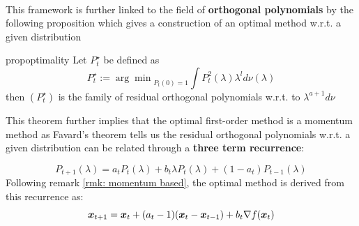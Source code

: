 \documentclass{article}
\begin{document}
\paragraph{}
This framework is further linked to the field of \textbf{orthogonal polynomials} by the following proposition which gives a construction of an optimal method w.r.t. a given distribution 
\begin{restatable}{prop}{optimality}\cite{pedregosa2020acceleration}
 \label{prop: optimality}
 Let $P_t^\star$ be defined as
 \begin{equation}
     P_t^\star:={\arg \min}_{P_t(0)=1} \int P_t^2(\lambda) \lambda^l d\nu(\lambda)
 \end{equation}
 then $(P_t^\star)$ is the family of residual orthogonal polynomials w.r.t. to $\lambda^{a+1}d\nu$
\end{restatable}

This theorem further implies that the  optimal first-order method is a momentum method as Favard's theorem \cite{marcellan2001favard} tells us the residual orthogonal polynomials w.r.t. a given distribution can be related through a \textbf{three term recurrence}:

\begin{equation}
    P_{t+1}(\lambda)=a_tP_t(\lambda)+b_t\lambda P_t(\lambda)+(1-a_t)P_{t-1}(\lambda)
\end{equation}
Following remark \ref{rmk: momentum based}, the optimal method is derived from this recurrence as:
\begin{equation}
    {\boldsymbol x}_{t+1}={\boldsymbol x}_t+(a_t-1)({\boldsymbol x}_t-{\boldsymbol x}_{t-1})+b_t\nabla f({\boldsymbol x}_t)
\end{equation}
\end{document}

